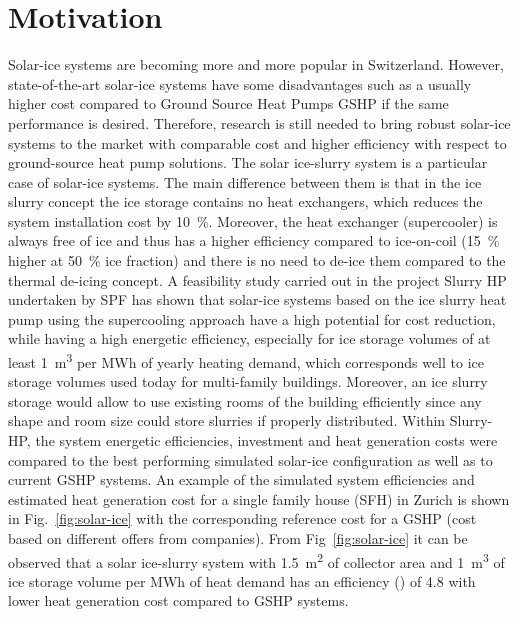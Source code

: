 \documentclass[english]{SFOEYearlyReportEnglish_2018}
\begin{document}
 

%


\section{Motivation}

Solar-ice systems are becoming more and more popular in Switzerland. However, state-of-the-art solar-ice systems have some disadvantages such as a usually higher cost compared to Ground Source Heat Pumps GSHP if the same performance is desired. Therefore, research is still needed to bring robust solar-ice systems to the market with comparable cost and higher efficiency with respect to ground-source heat pump solutions. 
The solar ice-slurry system is a particular case of solar-ice systems. The main difference between them is that in the ice slurry concept the ice storage contains no heat exchangers, which reduces the system installation cost by 10~\%. Moreover, the heat exchanger (supercooler) is always free of ice and thus has a higher efficiency compared to ice-on-coil (15~\% higher at 50~\% ice fraction) and there is no need to de-ice them compared to the thermal de-icing concept. A feasibility study carried out in the project Slurry HP undertaken by SPF \cite{SlurryHp_2017} has shown that solar-ice systems based on the ice slurry heat pump using the supercooling approach have a high potential for cost reduction, while having a high energetic efficiency, especially for ice storage volumes of at least \SI{1}{m^3} per MWh of yearly heating demand, which corresponds well to ice storage volumes used today for multi-family buildings. Moreover, an ice slurry storage would allow to use existing rooms of the building efficiently since any shape and room size could store slurries if properly distributed.
Within Slurry-HP, the system energetic efficiencies, investment and heat generation costs were compared to the best performing simulated solar-ice configuration as well as to current GSHP systems. An example of the simulated system efficiencies and estimated heat generation cost for a single family house (SFH) in Zurich is shown in Fig.~\ref{fig:solar-ice} with the corresponding reference cost for a GSHP (cost based on different offers from companies). From Fig~\ref{fig:solar-ice} it can be observed that a solar ice-slurry system with \SI{1.5}{m^2} of collector area and \SI{1}{m^3} of ice storage volume per MWh of heat demand has an efficiency (\si{\spf}) of 4.8 with lower heat generation cost compared to GSHP systems.
\end{document}
